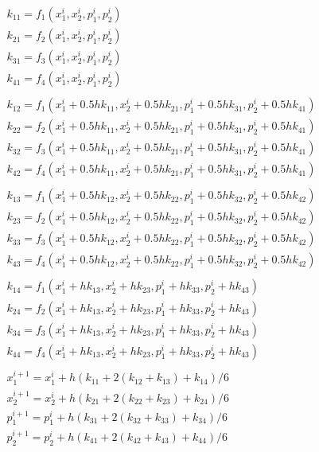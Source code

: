 \documentclass[a4paper,12pt]{article}
\begin{document}
\begin{gather*}
  k_{11}=f_1(x_1^i,x_2^i,p_1^i,p_2^i) \\
  k_{21}=f_2(x_1^i,x_2^i,p_1^i,p_2^i) \\
  k_{31}=f_3(x_1^i,x_2^i,p_1^i,p_2^i) \\
  k_{41}=f_4(x_1^i,x_2^i,p_1^i,p_2^i) \\
  {}\\
  k_{12}=f_1(x_1^i + 0.5h k_{11},x_2^i + 0.5h k_{21},p_1^i + 0.5h k_{31},p_2^i + 0.5h k_{41}) \\
  k_{22}=f_2(x_1^i + 0.5h k_{11},x_2^i + 0.5h k_{21},p_1^i + 0.5h k_{31},p_2^i + 0.5h k_{41}) \\
  k_{32}=f_3(x_1^i + 0.5h k_{11},x_2^i + 0.5h k_{21},p_1^i + 0.5h k_{31},p_2^i + 0.5h k_{41}) \\
  k_{42}=f_4(x_1^i + 0.5h k_{11},x_2^i + 0.5h k_{21},p_1^i + 0.5h k_{31},p_2^i + 0.5h k_{41}) \\
  {}\\
  k_{13}=f_1(x_1^i + 0.5h k_{12},x_2^i + 0.5h k_{22},p_1^i + 0.5h k_{32},p_2^i + 0.5h k_{42}) \\
  k_{23}=f_2(x_1^i + 0.5h k_{12},x_2^i + 0.5h k_{22},p_1^i + 0.5h k_{32},p_2^i + 0.5h k_{42}) \\
  k_{33}=f_3(x_1^i + 0.5h k_{12},x_2^i + 0.5h k_{22},p_1^i + 0.5h k_{32},p_2^i + 0.5h k_{42}) \\
  k_{43}=f_4(x_1^i + 0.5h k_{12},x_2^i + 0.5h k_{22},p_1^i + 0.5h k_{32},p_2^i + 0.5h k_{42}) \\
  {}\\
  k_{14}=f_1(x_1^i + h k_{13},x_2^i + h k_{23},p_1^i + h k_{33},p_2^i + h k_{43}) \\
  k_{24}=f_2(x_1^i + h k_{13},x_2^i + h k_{23},p_1^i + h k_{33},p_2^i + h k_{43}) \\
  k_{34}=f_3(x_1^i + h k_{13},x_2^i + h k_{23},p_1^i + h k_{33},p_2^i + h k_{43}) \\
  k_{44}=f_4(x_1^i + h k_{13},x_2^i + h k_{23},p_1^i + h k_{33},p_2^i + h k_{43}) \\
  {}\\
  x_1^{i+1}=x_1^{i}+ h (k_{11}+2(k_{12}+k_{13})+k_{14}) / 6 \\
  x_2^{i+1}=x_2^{i}+ h (k_{21}+2(k_{22}+k_{23})+k_{24}) / 6 \\
  p_1^{i+1}=p_1^{i}+ h (k_{31}+2(k_{32}+k_{33})+k_{34}) / 6 \\
  p_2^{i+1}=p_2^{i}+ h (k_{41}+2(k_{42}+k_{43})+k_{44}) / 6
\end{gather*}
\end{document}
